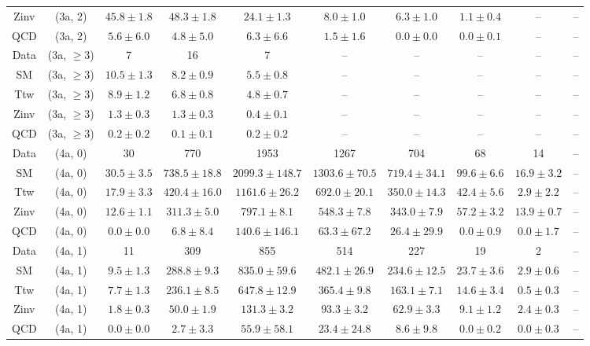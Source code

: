 \begin{table}[h!]
{\begin{tabular}{cccccccccc}
	Zinv & (3a, 2) & $45.8\pm 1.8$ & $48.3\pm 1.8$ & $24.1\pm 1.3$ & $8.0\pm 1.0$ & $6.3\pm 1.0$ & $1.1\pm 0.4$ & -- & -- \\[0.5ex] 
	QCD & (3a, 2) & $5.6\pm 6.0$ & $4.8\pm 5.0$ & $6.3\pm 6.6$ & $1.5\pm 1.6$ & $0.0\pm 0.0$ & $0.0\pm 0.1$ & -- & -- \\[0.5ex] 
	Data & (3a, $\ge3$) & 7 & 16 & 7 & -- & -- & -- & -- & -- \\[0.5ex] 
	SM & (3a, $\ge3$) & $10.5\pm 1.3$ & $8.2\pm 0.9$ & $5.5\pm 0.8$ & -- & -- & -- & -- & -- \\[0.5ex] 
	Ttw & (3a, $\ge3$) & $8.9\pm 1.2$ & $6.8\pm 0.8$ & $4.8\pm 0.7$ & -- & -- & -- & -- & -- \\[0.5ex] 
	Zinv & (3a, $\ge3$) & $1.3\pm 0.3$ & $1.3\pm 0.3$ & $0.4\pm 0.1$ & -- & -- & -- & -- & -- \\[0.5ex] 
	QCD & (3a, $\ge3$) & $0.2\pm 0.2$ & $0.1\pm 0.1$ & $0.2\pm 0.2$ & -- & -- & -- & -- & -- \\[0.5ex] 
	Data & (4a, 0) & 30 & 770 & 1953 & 1267 & 704 & 68 & 14 & -- \\[0.5ex] 
	SM & (4a, 0) & $30.5\pm 3.5$ & $738.5\pm 18.8$ & $2099.3\pm 148.7$ & $1303.6\pm 70.5$ & $719.4\pm 34.1$ & $99.6\pm 6.6$ & $16.9\pm 3.2$ & -- \\[0.5ex] 
	Ttw & (4a, 0) & $17.9\pm 3.3$ & $420.4\pm 16.0$ & $1161.6\pm 26.2$ & $692.0\pm 20.1$ & $350.0\pm 14.3$ & $42.4\pm 5.6$ & $2.9\pm 2.2$ & -- \\[0.5ex] 
	Zinv & (4a, 0) & $12.6\pm 1.1$ & $311.3\pm 5.0$ & $797.1\pm 8.1$ & $548.3\pm 7.8$ & $343.0\pm 7.9$ & $57.2\pm 3.2$ & $13.9\pm 0.7$ & -- \\[0.5ex] 
	QCD & (4a, 0) & $0.0\pm 0.0$ & $6.8\pm 8.4$ & $140.6\pm 146.1$ & $63.3\pm 67.2$ & $26.4\pm 29.9$ & $0.0\pm 0.9$ & $0.0\pm 1.7$ & -- \\[0.5ex] 
	Data & (4a, 1) & 11 & 309 & 855 & 514 & 227 & 19 & 2 & -- \\[0.5ex] 
	SM & (4a, 1) & $9.5\pm 1.3$ & $288.8\pm 9.3$ & $835.0\pm 59.6$ & $482.1\pm 26.9$ & $234.6\pm 12.5$ & $23.7\pm 3.6$ & $2.9\pm 0.6$ & -- \\[0.5ex] 
	Ttw & (4a, 1) & $7.7\pm 1.3$ & $236.1\pm 8.5$ & $647.8\pm 12.9$ & $365.4\pm 9.8$ & $163.1\pm 7.1$ & $14.6\pm 3.4$ & $0.5\pm 0.3$ & -- \\[0.5ex] 
	Zinv & (4a, 1) & $1.8\pm 0.3$ & $50.0\pm 1.9$ & $131.3\pm 3.2$ & $93.3\pm 3.2$ & $62.9\pm 3.3$ & $9.1\pm 1.2$ & $2.4\pm 0.3$ & -- \\[0.5ex] 
	QCD & (4a, 1) & $0.0\pm 0.0$ & $2.7\pm 3.3$ & $55.9\pm 58.1$ & $23.4\pm 24.8$ & $8.6\pm 9.8$ & $0.0\pm 0.2$ & $0.0\pm 0.3$ & -- \\[0.5ex] 

\end{tabular}}
\end{table}
